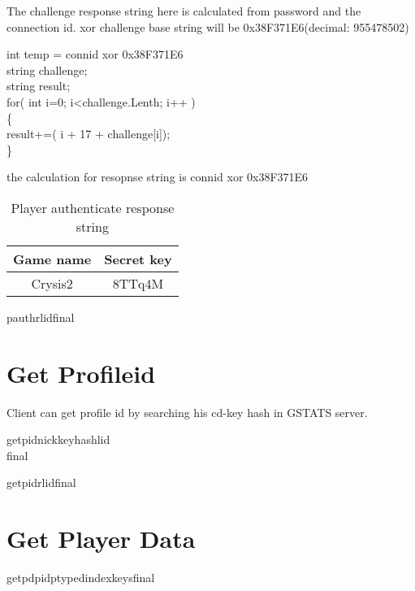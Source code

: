 \documentclass[oneside,titlepage,a4paper]{Definition/retrospy} %
\begin{document}
The challenge response string here is calculated from password and the connection id.
xor challenge base string will be 0x38F371E6(decimal: 955478502)
\begin{mybox}
int temp = connid xor 0x38F371E6\\
string challenge;\\
string result;\\
for( int i=0; i<challenge.Lenth; i++ )\\
\{\\
	result+=( i + 17 + challenge[i]);\\
\}
\end{mybox}
the calculation for resopnse string is connid xor 0x38F371E6
\begin{table}[H]
	\centering
	\begin{tabular}{|c|c|}
		\hline
		\textbf{Game name}&\textbf{Secret key}\\\hline
		Crysis2&8TTq4M\\\hline
	\end{tabular}
	\caption{Player authenticate response string}
	\label{Player authenticate response string}
\end{table}

\ServerResponse

\begin{mybox}[label = gstats player auth server response]
	\tbs pauthr\tbs <profile id>\tbs lid\tbs <local id>\tbs final\tbs
\end{mybox}



\section{Get Profileid}
Client can get profile id by searching his cd-key hash in GSTATS server.
\ClientRequest
\begin{mybox}
	\tbs getpid\tbs\tbs nick\tbs <nick name>\tbs keyhash\tbs<cd key hash>\tbs lid\tbs <local id>\\\tbs final\tbs
\end{mybox}

\ServerResponse

\begin{mybox}
	\tbs getpidr\tbs <profile id>\tbs lid\tbs<local id>\tbs final\tbs
\end{mybox}

\section{Get Player Data}
\ClientRequest
\begin{mybox}
	\tbs getpd\tbs\tbs pid\tbs<profile id>\tbs ptype\tbs<persist storage type>\tbs dindex\tbs <data index>\tbs keys\tbs final\tbs
\end{mybox}
\ServerResponse
\end{document}
